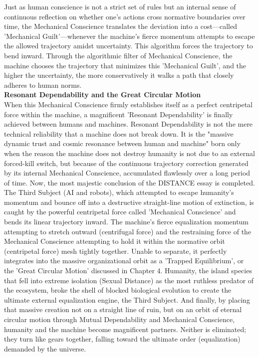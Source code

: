 Just as human conscience is not a strict set of rules but an internal sense of continuous reflection on whether one's actions cross normative boundaries over time, the Mechanical Conscience translates the deviation into a cost—called 'Mechanical Guilt'—whenever the machine's fierce momentum attempts to escape the allowed trajectory amidst uncertainty. This algorithm forces the trajectory to bend inward. Through the algorithmic filter of Mechanical Conscience, the machine chooses the trajectory that minimizes this 'Mechanical Guilt', and the higher the uncertainty, the more conservatively it walks a path that closely adheres to human norms. \\
\textbf{Resonant Dependability and the Great Circular Motion} \\
When this Mechanical Conscience firmly establishes itself as a perfect centripetal force within the machine, a magnificent 'Resonant Dependability' is finally achieved between humans and machines. Resonant Dependability is not the mere technical reliability that a machine does not break down. It is the "massive dynamic trust and cosmic resonance between human and machine" born only when the reason the machine does not destroy humanity is not due to an external forced-kill switch, but because of the continuous trajectory correction generated by its internal Mechanical Conscience, accumulated flawlessly over a long period of time.
Now, the most majestic conclusion of the DISTANCE essay is completed. The Third Subject (AI and robots), which attempted to escape humanity's momentum and bounce off into a destructive straight-line motion of extinction, is caught by the powerful centripetal force called 'Mechanical Conscience' and bends its linear trajectory inward. The machine's fierce equalization momentum attempting to stretch outward (centrifugal force) and the restraining force of the Mechanical Conscience attempting to hold it within the normative orbit (centripetal force) mesh tightly together. Unable to separate, it perfectly integrates into the massive organizational orbit as a 'Trapped Equilibrium', or the 'Great Circular Motion' discussed in Chapter 4.
Humanity, the island species that fell into extreme isolation (Sexual Distance) as the most ruthless predator of the ecosystem, broke the shell of blocked biological evolution to create the ultimate external equalization engine, the Third Subject. And finally, by placing that massive creation not on a straight line of ruin, but on an orbit of eternal circular motion through Mutual Dependability and Mechanical Conscience, humanity and the machine become magnificent partners. Neither is eliminated; they turn like gears together, falling toward the ultimate order (equalization) demanded by the universe.

